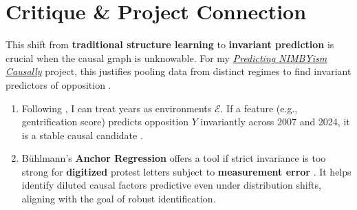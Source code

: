 \documentclass[11pt]{article}
\begin{document}
\section*{Critique \& Project Connection}
This shift from \textbf{traditional structure learning} \autocite[Ch.~7]{peters2018}
to \textbf{invariant prediction} \autocite{peters2016}
is crucial when the causal graph \autocites{pearl2009}{peters2018}
is unknowable.
    For my \href{https://github.com/dhardestylewis/thesis/blob/main/Blei-Invariance_Causality-2026Spring/Project_Proposal.d/2026-02-02/Project_Proposal_Final_V21.pdf}{\textit{Predicting NIMBYism Causally}} project, this justifies pooling data from distinct regimes to find invariant predictors of opposition \autocite{peters2016}.
\begin{enumerate}
    \item Following \textcite{peters2016}, I can treat years as environments $\mathcal{E}$.
    If a feature (e.g., gentrification score) predicts opposition $Y$ invariantly across 2007 and 2024, it is a stable causal candidate \autocite[Proposition~4.1]{buhlmann2020}.
    \item B\"uhlmann's \textbf{Anchor Regression} \autocite[Eq.~4.3]{buhlmann2020}
    offers a tool if strict invariance is too strong for \textbf{digitized} protest letters subject to \textbf{measurement error} \autocite{peters2018}.
    It helps identify diluted causal factors
    predictive even under distribution shifts, aligning with the goal of robust \autocite{buhlmann2020}
    identification.
\end{enumerate}
\end{document}
